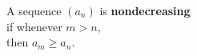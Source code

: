 \documentclass[border=6pt]{standalone}
\begin{document}
\parbox{2in}{A sequence $(a_n)$ is \textbf{nondecreasing} \\
  \null\quad if whenever $m > n$, \\
  \null\quad\quad then $a_m \geq a_n$.}
\end{document}
